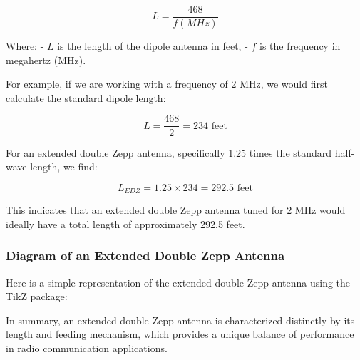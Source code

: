 \[
L = \frac{468}{f(MHz)}
\]

Where:
- \(L\) is the length of the dipole antenna in feet,
- \(f\) is the frequency in megahertz (MHz).

For example, if we are working with a frequency of 2 MHz, we would first calculate the standard dipole length:

\[
L = \frac{468}{2} = 234 \text{ feet}
\]

For an extended double Zepp antenna, specifically 1.25 times the standard half-wave length, we find:

\[
L_{EDZ} = 1.25 \times 234 = 292.5 \text{ feet}
\]

This indicates that an extended double Zepp antenna tuned for 2 MHz would ideally have a total length of approximately 292.5 feet. 

\subsubsection{Diagram of an Extended Double Zepp Antenna}

Here is a simple representation of the extended double Zepp antenna using the TikZ package:

\begin{center}
\end{center}

In summary, an extended double Zepp antenna is characterized distinctly by its length and feeding mechanism, which provides a unique balance of performance in radio communication applications.
